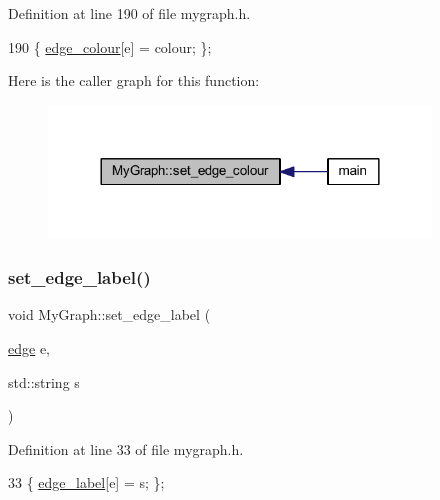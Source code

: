 Definition at line 190 of file mygraph.\+h.


\begin{DoxyCode}
190 \{ \mbox{\hyperlink{class_my_graph_aa10654166ca504696731c7f8011a5680}{edge\_colour}}[e] = colour; \};
\end{DoxyCode}
Here is the caller graph for this function\+:
\nopagebreak
\begin{figure}[H]
\begin{center}
\leavevmode
\includegraphics[width=288pt]{class_my_graph_a865b0e9fd7f74cd40f23230733746a93_icgraph}
\end{center}
\end{figure}
\mbox{\label{class_my_graph_a66d63b8b481c36437061989a868df064}} 
\subsubsection{\texorpdfstring{set\+\_\+edge\+\_\+label()}{set\_edge\_label()}}
{\footnotesize\ttfamily void My\+Graph\+::set\+\_\+edge\+\_\+label (\begin{DoxyParamCaption}\item[{\mbox{\hyperlink{classedge}{edge}}}]{e,  }\item[{std\+::string}]{s }\end{DoxyParamCaption})\hspace{0.3cm}{\ttfamily [inline]}}



Definition at line 33 of file mygraph.\+h.


\begin{DoxyCode}
33 \{ \mbox{\hyperlink{class_my_graph_ac87b3f22352ddc7ec3864173a0d69cdd}{edge\_label}}[e] = s; \};
\end{DoxyCode}
\mbox{\label{class_my_graph_a798846d9c09d7d5b49db3c75fb1f7f38}} 
